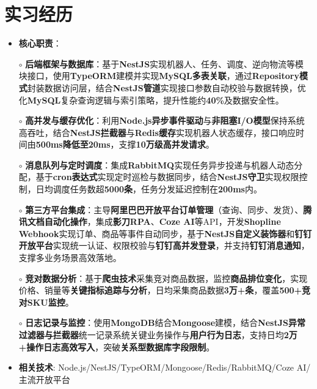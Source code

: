 \section{实习经历}
  \begin{normalsize}
    \begin{itemize}
    \item \textbf{核心职责}：
    \setlength{\itemindent}{1em} %
  \item[$\circ$] \textbf{后端框架与数据库}：基于\textbf{NestJS}实现机器人、任务、调度、逆向物流等模块接口，使用\textbf{TypeORM}建模并实现\textbf{MySQL多表关联}，通过\textbf{Repository模式}封装数据访问层，结合\textbf{NestJS管道}实现接口参数自动校验与数据转换，优化\textbf{MySQL}复杂查询逻辑与索引策略，提升性能约\textbf{40\%}及数据安全性。
  \item[$\circ$] \textbf{高并发与缓存优化}：利用\textbf{Node.js异步事件驱动}与\textbf{非阻塞I/O模型}保持系统高吞吐，结合\textbf{NestJS拦截器}与\textbf{Redis缓存}实现机器人状态缓存，接口响应时间由\textbf{500ms降低至20ms}，支撑\textbf{10万级高并发请求}。
  \item[$\circ$] \textbf{消息队列与定时调度}：集成\textbf{RabbitMQ}实现任务异步投递与机器人动态分配，基于\textbf{cron表达式}实现定时巡检与数据同步，结合\textbf{NestJS守卫}实现权限控制，日均调度任务数超\textbf{5000条}，任务分发延迟控制在\textbf{200ms}内。
  \item[$\circ$] \textbf{第三方平台集成}：主导\textbf{阿里巴巴开放平台订单管理}（查询、同步、发货）、\textbf{腾讯文档自动化操作}，集成\textbf{影刀RPA}、\textbf{Coze AI}等API，开发\textbf{Shopline Webhook}实现订单、商品等事件自动同步，基于\textbf{NestJS自定义装饰器}和\textbf{钉钉开放平台}实现统一认证、权限校验与\textbf{钉钉高并发登录}，并支持\textbf{钉钉消息通知}，支撑多业务场景高效落地。
  \item[$\circ$] \textbf{竞对数据分析}：基于\textbf{爬虫技术}采集竞对商品数据，监控\textbf{商品排位变化}，实现价格、销量等\textbf{关键指标追踪与分析}，日均采集商品数据\textbf{3万+条}，覆盖\textbf{500+竞对SKU监控}。
  \item[$\circ$] \textbf{日志记录与监控}：使用\textbf{MongoDB}结合\textbf{Mongoose}建模，结合\textbf{NestJS异常过滤器与拦截器}统一记录系统关键业务操作与\textbf{用户行为日志}，支持日均\textbf{2万+操作日志高效写入}，突破\textbf{关系型数据库字段限制}。
    \setlength{\itemindent}{0em} %
    \item \textbf{相关技术}: Node.js/NestJS/TypeORM/Mongoose/Redis/RabbitMQ/Coze AI/主流开放平台
    \end{itemize}
  \end{normalsize}
